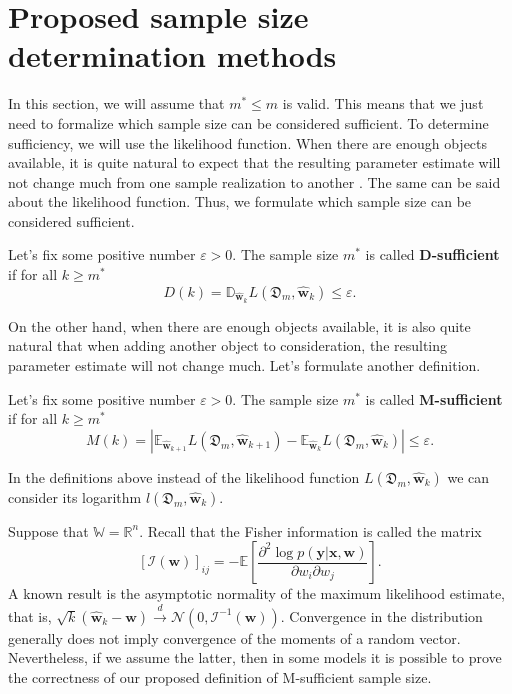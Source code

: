\documentclass[runningheads]{llncs}
\begin{document}
\section{Proposed sample size determination methods}

In this section, we will assume that $m^*\leqslant m$ is valid. This means that we just need to formalize which sample size can be considered sufficient. To determine sufficiency, we will use the likelihood function. When there are enough objects available, it is quite natural to expect that the resulting parameter estimate will not change much from one sample realization to another \cite{Joseph1997,Joseph1995}. The same can be said about the likelihood function. Thus, we formulate which sample size can be considered sufficient.

\begin{definition}
    \label{sufficient-variance}
    Let's fix some positive number $\varepsilon > 0$. The sample size $m^*$ is called \textbf{D-sufficient} if for all $k\geqslant m^*$
    \[ D(k) = \mathbb{D}_{\hat{\mathbf{w}}_{k}} L(\mathfrak{D}_m, \hat{\mathbf{w}}_{k}) \leqslant \varepsilon. \]
\end{definition}

On the other hand, when there are enough objects available, it is also quite natural that when adding another object to consideration, the resulting parameter estimate will not change much. Let's formulate another definition.

\begin{definition}
    \label{sufficient-difference}
    Let's fix some positive number $\varepsilon > 0$. The sample size $m^*$ is called \textbf{M-sufficient} if for all $k\geqslant m^*$ 
    \[ M(k) = \left| \mathbb{E}_{\hat{\mathbf{w}}_{k+1}} L(\mathfrak{D}_m, \hat{\mathbf{w}}_{k+1}) - \mathbb{E}_{\hat{\mathbf{w}}_{k}} L(\mathfrak{D}_m, \hat{\mathbf{w}}_{k}) \right| \leqslant \varepsilon. \]
\end{definition}
In the definitions above instead of the likelihood function $L(\mathfrak{D}_m, \hat{\mathbf{w}}_{k})$ we can consider its logarithm $l(\mathfrak{D}_m, \hat{\mathbf{w}}_{k})$.

Suppose that $\mathbb{W} = \mathbb{R}^n$. Recall that the Fisher information is called the matrix
\[ \left[\mathcal{I}(\mathbf{w})\right]_{ij} = - \mathbb{E}\left[ \dfrac{\partial^2 \log p(\mathbf{y} | \mathbf{x}, \mathbf{w})}{\partial w_i \partial w_j} \right]. \]
A known result is the asymptotic normality of the maximum likelihood estimate, that is, $\sqrt{k}\left(\hat{\mathbf{w}}_k -\mathbf{w}\right)\xrightarrow{d}\mathcal{N}\left(0, \mathcal{I}^{-1}(\mathbf{w})\right)$. Convergence in the distribution generally does not imply convergence of the moments of a random vector. Nevertheless, if we assume the latter, then in some models it is possible to prove the correctness of our proposed definition of M-sufficient sample size.
\end{document}
